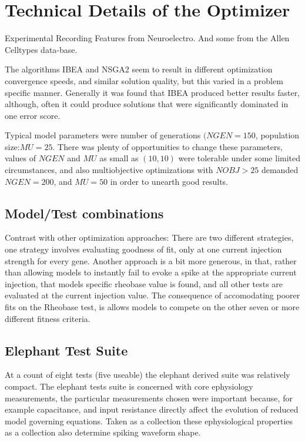 \section*{Technical Details of the Optimizer}
Experimental Recording Features from Neuroelectro. And some from the Allen Celltypes data-base.


The algorithms IBEA and NSGA2 seem to result in different optimization convergence speeds, and similar solution quality, but this varied in a problem specific manner. Generally it was found that IBEA produced better results faster, although, often it could produce solutions that were significantly dominated in one error score.

Typical model parameters were number of generations $(NGEN=150$, population size:$MU=25$. There was plenty of opportunities to change these parameters,  values of $NGEN$ and $MU$ as small as $(10,10)$ were tolerable under some limited circumstances, and also multiobjective optimizations with $NOBJ>25$ demanded $NGEN=200$, and $MU=50$ in order to unearth good results.


\subsection{Model/Test combinations}

Contrast with other optimization approaches:
There are two different strategies, one strategy involves evaluating goodness of fit, only at one current injection strength for every gene. Another approach is a bit more generous, in that, rather than allowing models to instantly fail to evoke a spike at the appropriate current injection, that models specific rheobase value is found, and all other tests are evaluated at the current injection value. The consequence of accomodating poorer fits on the Rheobase test, is allows models to compete on the other seven or more different fitness criteria.

\subsection{Elephant Test Suite}
At a count of eight tests (five useable) the elephant derived suite was relatively compact. The elephant tests suite is concerned with core ephysiology measurements, the particular measurements chosen were important because, for example capacitance, and input resistance directly affect the evolution of reduced model governing equations. Taken as a collection these ephysiological properties as a collection also determine spiking waveform shape. 

